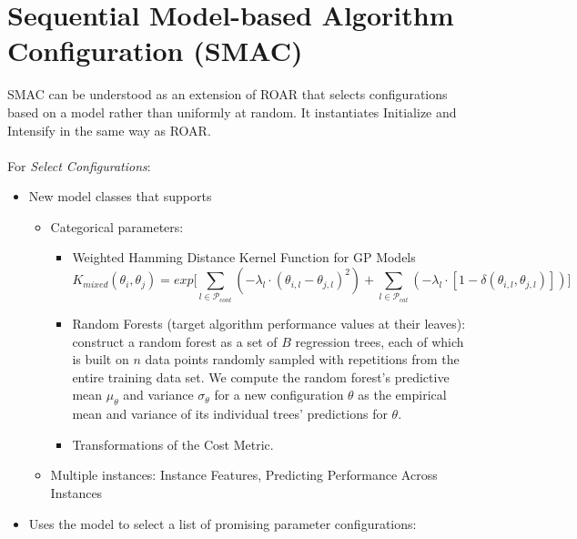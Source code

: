 \documentclass[10pt]{article}
\theoremstyle{definition}
\begin{document}
\section{Sequential Model-based Algorithm Configuration (SMAC)}
SMAC can be understood as an extension of ROAR that selects configurations based on a model
rather than uniformly at random. It instantiates Initialize and Intensify in the same way as ROAR.\\
\text{}\\
For {\it Select Configurations}:
\begin{itemize}
	\item New model classes that supports
	      \begin{itemize}
		      \item Categorical parameters:
		            \begin{itemize}
			            \item Weighted Hamming Distance Kernel Function for GP Models
			                  \begin{equation*}
				                  K_{mixed}(\theta_i, \theta_j) =
				                  exp\big[\sum_{l \in \mathcal{P}_{cont}}(-\lambda_{l}\cdot (\theta_{i, l} - \theta_{j, l})^2)
					                  + \sum_{l \in \mathcal{P}_{cat}}(-\lambda_{l}\cdot [1- \delta(\theta_{i, l},\theta_{j, l})]) \big]
			                  \end{equation*}
			            \item Random Forests (target algorithm performance values at their leaves): construct a random forest as a set of $B$ regression
                              trees, each of which is built on $n$ data points randomly sampled with repetitions from the entire training data set. 
                              We compute the random forest’s predictive mean $\mu_{\theta}$ and variance $\sigma_{\theta}$
                              for a new configuration $\theta$ as the empirical mean and variance of its individual trees’ predictions for $\theta$.
                        \item Transformations of the Cost Metric.
		            \end{itemize}
		      \item Multiple instances: Instance Features, Predicting Performance Across Instances
	      \end{itemize}
    \item Uses the model to select a list of promising parameter configurations:
        \begin{itemize}

\end{itemize}
\end{itemize}
\end{document}
